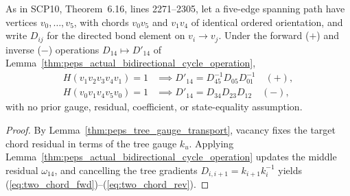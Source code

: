\begin{lemma}
    \label{thm:peps_actual_two_chord_transport}
    \leanok
    As in SCP10, Theorem~6.16, lines 2271--2305, let a five-edge spanning path have vertices
    $v_0,\ldots,v_5$, with chords $v_0v_5$ and $v_1v_4$ of identical ordered orientation, and write $D_{ij}$ for the directed bond element on $v_i\to v_j$.
    Under the forward ($+$) and inverse ($-$) operations $D_{14}\mapsto D'_{14}$ of Lemma~\ref{thm:peps_actual_bidirectional_cycle_operation},
    \begin{align}
        H(v_1v_2v_3v_4v_1)=1 & \implies D'_{14}=D_{45}^{-1}D_{05}D_{01}^{-1} \quad (+), \label{eq:two_chord_fwd} \\
        H(v_0v_1v_4v_5v_0)=1 & \implies D'_{14}=D_{34}D_{23}D_{12} \quad (-), \label{eq:two_chord_rev}
    \end{align}
    with no prior gauge, residual, coefficient, or state-equality assumption.
\end{lemma}
\begin{proof}\leanok
    By Lemma~\ref{thm:peps_tree_gauge_transport}, vacancy fixes the target chord residual in terms of the tree gauge $k_u$.
    Applying Lemma~\ref{thm:peps_actual_bidirectional_cycle_operation} updates the middle residual $\omega_{14}$, and cancelling the tree gradients $D_{i,i+1}=k_{i+1}k_i^{-1}$ yields (\ref{eq:two_chord_fwd})--(\ref{eq:two_chord_rev}).
\end{proof}

